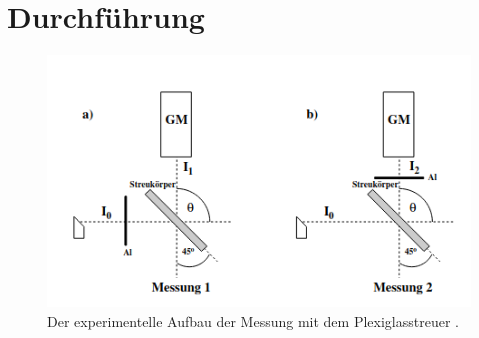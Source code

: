 \section{Durchführung}
\label{sec:Durchführung}

    \begin{figure}
        \centering
        \includegraphics[width=\textwidth]{bilder/plexiglas_aufbau.png}
        \caption{Der experimentelle Aufbau der Messung mit dem Plexiglasstreuer \cite{anleitung}. }
        \label{fig:}
    \end{figure}
